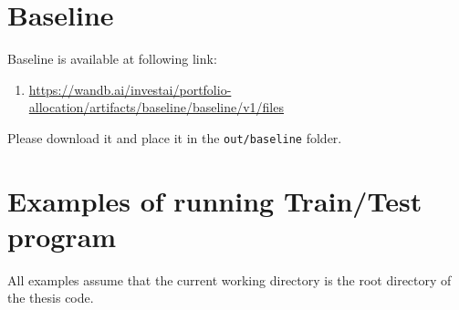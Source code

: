 \documentclass[../xlapes02]{subfiles}
\begin{document}
    \section{Baseline}\label{sec:baseline}
    Baseline is available at following link:
    \begin{enumerate}
        \item \url{https://wandb.ai/investai/portfolio-allocation/artifacts/baseline/baseline/v1/files}
    \end{enumerate}
    Please download it and place it in the \texttt{out/baseline} folder.

%
%


    \section{Examples of running Train/Test program}\label{sec:examples-of-running-train/test-program}
    All examples assume that the current working directory is the root directory of the thesis code.
\end{document}
